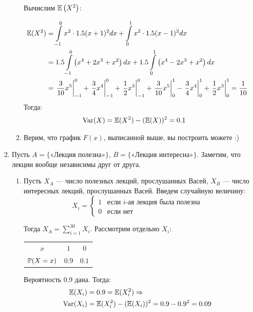 \begin{enumerate}
\begin{enumerate}
Вычислим $\E\left(X^2\right)$:

\begin{align*}
\E(X^2) &= \int \limits_{-1}^0 x^2 \cdot 1.5 (x + 1)^2 dx +  \int \limits_0^1 x^2 \cdot 1.5 (x - 1)^2 dx \\
&= 1.5 \int \limits_{-1}^0\left( x^4 + 2x^3 + x^2\right) dx + 1.5 \int \limits_0^1\left( x^4 -2x^3 + x^2\right) dx \\
&= \left. \frac{3}{10} x^5 \right|_{-1}^0 + \left. \frac{3}{4} x^4 \right|_{-1}^0 +
\left. \frac{1}{2} x^3 \right|_{-1}^0 + \left. \frac{3}{10} x^5 \right|_0^1 -
\left. \frac{3}{4} x^4 \right|_0^1  + \left. \frac{1}{2} x^3 \right|_0^1 = \frac{1}{10} \\
\end{align*}
Тогда:
\begin{align*}
&\Var(X) = \E(X^2) - (\E(X))^2 = 0.1
\end{align*}

\item Верим, что график $F(x)$, выписанной выше, вы построить можете :)
\end{enumerate}
\item
Пусть $A = \{\text{«Лекция полезна»}\}$, $B = \{\text{«Лекция интересна»}\}$. Заметим, что лекции вообще независимы друг от друга.

\begin{enumerate}
\item Пусть $X_A$ — число полезных лекций, прослушанных Васей,  $X_B$ — число интересных лекций, прослушанных Васей. Введем случайную величину:
\[X_i =
\begin{cases}
1 & \text{если } i\text{-ая лекция была полезна}\\
0 & \text{если нет}
\end{cases}
\]

Тогда $X_A = \sum\limits_{i=1}^{30}X_i$. Рассмотрим отдельно $X_i$:

\begin{center}
\begin{tabular}{@{}ccc@{}}
\toprule
$x$         & $1$             & $0$               \\
$\P(X=x)$ & $0.9$ & $0.1$ \\ \bottomrule
\end{tabular}
\end{center}

Вероятность $0.9$ дана. Тогда:
\begin{align*}
\E(X_i) &= 0.9 = \E(X^2_i) \Rightarrow \\
\Var(X_i) &= \E(X^2_i) - (\E(X_i))^2 = 0.9 - 0.9^2 = 0.09
\end{align*}


\end{enumerate}
\end{enumerate}

